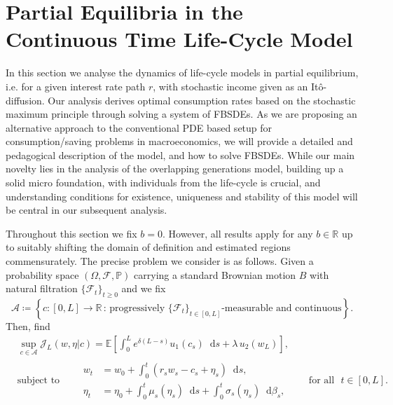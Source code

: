 \documentclass[11pt,oneside,english,reqno,dvipsnames,table]{amsart}
\numberwithin{equation}{section}
\theoremstyle{plain}
\theoremstyle{definition}
\theoremstyle{remark}
\theoremstyle{plain}
\theoremstyle{plain}
\theoremstyle{plain}
\theoremstyle{plain}
\theoremstyle{plain}
\theoremstyle{plain}
\theoremstyle{plain}
\newcommand{\EE}{\mathbb{E}}
\newcommand{\dd}{\mathop{}\!\mathrm{d}}
\newcommand{\mcA}{\mathcal{A}}
\newcommand{\mcF}{\mathcal{F}}
\newcommand{\mcJ}{\mathcal{J}}
\newcommand{\mbP}{\mathbb{P}}
\newcommand{\mbR}{\mathbb{R}}
\numberwithin{thm}{section}
\begin{document}
%
%
%
%
\section{Partial Equilibria in the Continuous Time Life-Cycle Model}\label{sec:life_cycle_partial_equilibria}




 In this section we analyse the dynamics of life-cycle models  in partial equilibrium, i.e. for a given interest rate path $r$, with stochastic income given as an It\^o-diffusion. Our analysis derives optimal consumption rates based on the stochastic maximum principle through solving a system of FBSDEs. As we are proposing an alternative approach to the conventional PDE based setup for consumption/saving problems in macroeconomics, we will provide a detailed and pedagogical description of the model, and how to solve FBSDEs. While our main novelty lies in the analysis of the overlapping generations model, building up a solid micro foundation, with individuals from the life-cycle is crucial, and understanding conditions for existence, uniqueness and stability of this model will be central in our subsequent analysis. 

Throughout this section we fix $b=0$. However, all results apply for any $b\in \mbR$ up to suitably shifting the domain of definition and estimated regions commensurately. The precise problem we consider is as follows. Given a probability space $(\Omega,\mcF,\mbP)$ carrying a standard Brownian motion $B$ with natural filtration $\{\mcF_t\}_{t\geq 0}$ and we fix
%
\begin{equation}\label{eq:life_cycle_set}
     \mcA \coloneqq \left\{c:[0,L]\to \mbR\,:\, \text{progressively } \{\mcF_t\}_{t\in [0,L]}\text{-measurable and continuous} \right\}.
 \end{equation}
%
Then, find
%
\begin{equation}\label{eq:life_cycle_problem}
\begin{aligned}
     &\sup_{c\in \mcA}\mcJ_L(w,\eta|c)=\EE\left[\int_0^L e^{\delta(L- s)}u_1(c_s)\dd s + \lambda \, u_2(w_L)\right],\\
      &\text{subject to}  \qquad \begin{aligned}
        w_t &=w_0 + \int_0^t (r_s w_s-c_s+\eta_s)\dd s,
        \\
         \eta_t &= \eta_0 + \int_0^t \mu_s(\eta_s) \dd s +\int_0^t \sigma_s(\eta_s) \dd \beta_s,
    \end{aligned} \qquad \text{for all }\,\, t\in [0,L].
\end{aligned}
%  
\end{equation}
%
\end{document}
